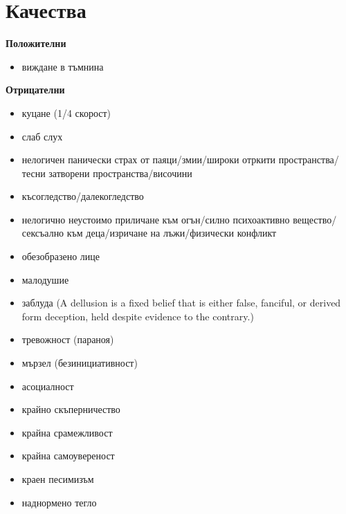 \section{Качества}

\textbf{Положителни}
\begin{itemize}
\item{виждане в тъмнина}
\end{itemize}

\vspace{0.7cm}
\textbf{Отрицателни}
\begin{itemize}
\item{куцане (1/4 скорост)}
\item{слаб слух}
\item{нелогичен панически страх от паяци/змии/широки отркити пространства/тесни затворени пространства/височини}
\item{късогледство/далекогледство}
\item{нелогично неустоимо приличане към огън/силно психоактивно вещество/сексъално към деца/изричане на лъжи/физически конфликт}
\item{обезобразено лице}
\item{малодушие}
\item{заблуда (A dellusion is a fixed belief that is either false, fanciful, or derived form deception, held despite evidence to the contrary.)}
\item{тревожност (параноя)}
\item{мързел (безинициативност)}
\item{асоциалност}
\item{крайно скъперничество}
\item{крайна срамежливост}
\item{крайна самоувереност}
\item{краен песимизъм}
\item{наднормено тегло}
\end{itemize}

